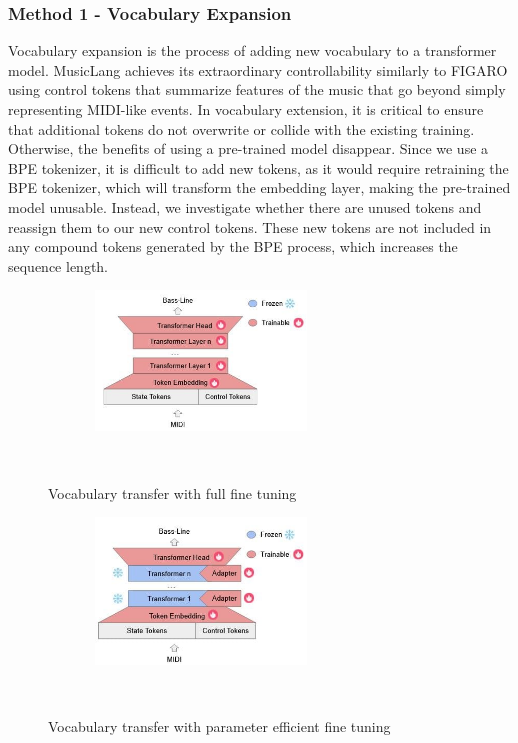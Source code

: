\subsubsection{Method 1 - Vocabulary Expansion}

Vocabulary expansion is the process of adding new vocabulary to a transformer model. MusicLang achieves its extraordinary controllability similarly to FIGARO \cite{Rütte_figaro_2023} using control tokens that summarize features of the music that go beyond simply representing MIDI-like events. In vocabulary extension, it is critical to ensure that additional tokens do not overwrite or collide with the existing training. Otherwise, the benefits of using a pre-trained model disappear. Since we use a BPE tokenizer, it is difficult to add new tokens, as it would require retraining the BPE tokenizer, which will transform the embedding layer, making the pre-trained model unusable. Instead, we investigate whether there are unused tokens and reassign them to our new control tokens. These new tokens are not included in any compound tokens generated by the BPE process, which increases the sequence length.

\begin{figure}[H]
    \centering
    \includegraphics[width=0.5\textwidth]{IMAGES/full_ft.jpg}
    \caption{Vocabulary transfer with full fine tuning}
    \label{fig:vocabtrans1}
\end{figure}

\begin{figure}[H]
    \centering
    \includegraphics[width=0.5\textwidth]{IMAGES/vocab_lora_ft.jpg} 
    \caption{Vocabulary transfer with parameter efficient fine tuning}
    \label{fig:vocabtrans2}
\end{figure}

